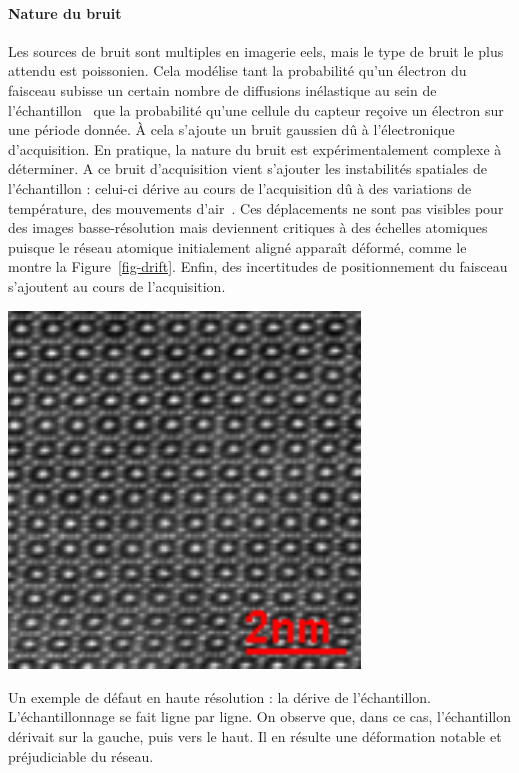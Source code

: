     \paragraph*{Nature du bruit} Les sources de bruit sont multiples en imagerie \gls{eels}, mais le type de bruit le plus attendu est poissonien. Cela modélise tant la probabilité qu'un électron du faisceau subisse un certain nombre de diffusions inélastique au sein de l'échantillon~\cite[Section~4.1.1]{egerton2011electron} que la probabilité qu'une cellule du capteur reçoive un électron sur une période donnée. \`A cela s'ajoute un bruit gaussien dû à l'électronique d'acquisition.
    En pratique, la nature du bruit est expérimentalement complexe à déterminer.
    A ce bruit d'acquisition vient s'ajouter les instabilités spatiales de l'échantillon : celui-ci dérive au cours de l'acquisition dû à des variations de température, des mouvements d'air~\cite{zobelli2019spatial}. Ces déplacements ne sont pas visibles pour des images basse-résolution mais deviennent critiques à des échelles atomiques puisque le réseau atomique initialement aligné apparaît déformé, comme le montre la Figure~\ref{fig-drift}.
    Enfin, des incertitudes de positionnement du faisceau s'ajoutent au cours de l'acquisition.

    \begin{marginfigure}
    	\centering
    	\includegraphics[width=0.7\textwidth]{img/chapitre2/figure7/drift-sc.png}
    	\caption{Un exemple de défaut en haute résolution : la dérive de l'échantillon. L'échantillonnage se fait ligne par ligne. On observe que, dans ce cas, l'échantillon dérivait sur la gauche, puis vers le haut. Il en résulte une déformation notable et préjudiciable du réseau.}
    	\label{fig-drift}
    \end{marginfigure}


